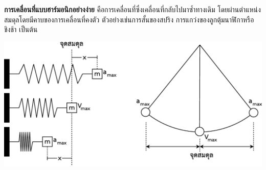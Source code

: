 \textbf{การเคลื่อนที่แบบฮาร์มอนิกอย่างง่าย}  คือการเคลื่อนที่ซึ่งเคลื่อนที่กลับไปมาซ้ำทางเดิม  โดยผ่านตำแหน่งสมดุลโดยมีคาบของการเคลื่อนที่คงตัว   ตัวอย่างเช่นการสั้นของสปริง   การแกว่งของลูกตุ้มนาฬิกาหรือชิงช้า  เป็นต้น \\
\begin{center}
\includegraphics[width=\textwidth]{content-13.eps}
\end{center}
